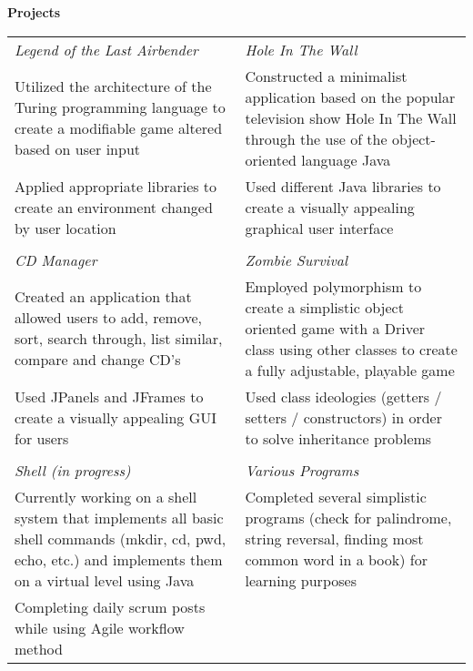 \documentclass{article}
\begin{document}
	\vspace*{0.5 cm}
	\textbf{\normalsize{Projects}} \\
	\begin{tabular}{m{3.35 in} m{3.35 in}}
		{\normalsize \emph{Legend of the Last Airbender}} & {\normalsize \emph{Hole In The Wall}} \\
			{\textbullet \normalsize { Utilized the architecture of the Turing programming language to create a modifiable game altered based on user input}} 
			&
			{\textbullet \normalsize { Constructed a minimalist application based on the popular television show Hole In The Wall through the use of the object-oriented language Java}} \\
		
			{\textbullet \normalsize { Applied appropriate libraries to create an environment changed by user location}}
			&
			{\textbullet \normalsize { Used different Java libraries to create a visually appealing graphical user interface}} \\
			
		\\[.1 cm]
		
		{\normalsize \emph{CD Manager}} & {\normalsize \emph{Zombie Survival}} \\
			{\textbullet \normalsize { Created an application that allowed users to add, remove, sort, search through, list similar, compare and change CD’s}}
			&
			{\textbullet \normalsize { Employed polymorphism to create a simplistic object oriented game with a Driver class using other classes to create a fully adjustable, playable game}}\\
			{\textbullet \normalsize { Used JPanels and JFrames to create a visually appealing GUI for users}}
			& 
			{\textbullet \normalsize { Used class ideologies (getters / setters / constructors) in order to solve inheritance problems}} \\
			
		\\[.1 cm]
		
		{\normalsize \emph{Shell (in progress)}} & {\normalsize \emph{Various Programs}} \\
			{\textbullet \normalsize { Currently working on a shell system that implements all basic shell commands (mkdir, cd, pwd, echo, etc.) and implements them on a virtual level using Java}} 
			&
			{\textbullet \normalsize { Completed several simplistic programs (check for palindrome, string reversal, finding most common word in a book) for learning purposes}}\\
			{\textbullet \normalsize { Completing daily scrum posts while using Agile workflow method}}
	\end{tabular}
\end{document}
